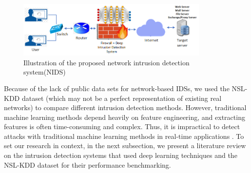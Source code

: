 \documentclass[runningheads]{llncs}
\begin{document}
 \begin{figure}
    \centering
  \includegraphics[width=0.85\textwidth]{Figures/NIDS.png}
    \caption{Illustration of the proposed network intrusion detection system(NIDS)}
    \label{fig:NIDS}
  \end{figure}
  


Because of the lack of public data sets for network-based IDSs,  we used the NSL-KDD dataset (which may not be a perfect representation of existing real networks) to compare different intrusion detection methods.
However, traditional machine learning methods depend heavily on feature engineering, and extracting features is often time-consuming and complex. Thus, it is impractical to detect attacks with traditional machine learning methods in real-time applications \cite{LIU2018}. To set our research in context, in the next subsection, we present a literature review on the intrusion detection systems that used deep learning techniques and the NSL-KDD dataset for their performance benchmarking. 
\end{document}
